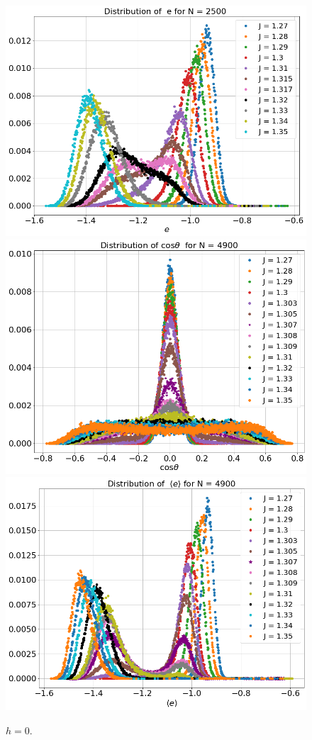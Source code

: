 \begin{figure}[H]
 	\includegraphics[scale=0.25]{Images/distr_energy_2500.png}
 	\\
 	\includegraphics[scale=0.25]{Images/distr_cos_4900.png}
 	\includegraphics[scale=0.25]{Images/distr_energy_4900.png}
 	\caption{$h=0$.  }
 	\label{fig:distributions}
 \end{figure}


